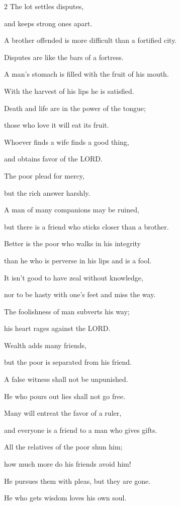 \begin{multicols}{2}
\myverse{}The lot settles disputes,

and keeps strong ones apart.


\myverse{}A brother offended is more difficult than a fortified city.

Disputes are like the bars of a fortress.


\myverse{}A man’s stomach is filled with the fruit of his mouth.

With the harvest of his lips he is satisfied.


\myverse{}Death and life are in the power of the tongue;

those who love it will eat its fruit.


\myverse{}Whoever finds a wife finds a good thing,

and obtains favor of the LORD.


\myverse{}The poor plead for mercy,

but the rich answer harshly.


\myverse{}A man of many companions may be ruined,

but there is a friend who sticks closer than a brother.


\mychapter{} \myverse*{}Better is the poor who walks in his integrity

\quad\quad than he who is perverse in his lips and is a fool.


\myverse{}It isn’t good to have zeal without knowledge,

nor to be hasty with one’s feet and miss the way.


\myverse{}The foolishness of man subverts his way;

his heart rages against the LORD.


\myverse{}Wealth adds many friends,

but the poor is separated from his friend.


\myverse{}A false witness shall not be unpunished.

He who pours out lies shall not go free.


\myverse{}Many will entreat the favor of a ruler,

and everyone is a friend to a man who gives gifts.


\myverse{}All the relatives of the poor shun him;

how much more do his friends avoid him!

He pursues them with pleas, but they are gone.


\myverse{}He who gets wisdom loves his own soul.


\end{multicols}
